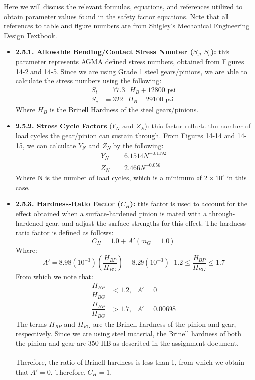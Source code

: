 \documentclass[letterpaper,12pt]{article}
\begin{document}
\noindent Here we will discuss the relevant formulas, equations, and references utilized to obtain parameter values found in the safety factor equations. Note that all references to table and figure numbers are from Shigley's Mechanical Engineering Design Textbook.
\begin{itemize}[leftmargin=3mm]
    \item \textbf{2.5.1. Allowable Bending/Contact Stress Number ($S_t$, $S_c$):} this parameter represents AGMA defined stress numbers, obtained from Figures 14-2 and 14-5. Since we are using Grade 1 steel gears/pinions, we are able to calculate the stress numbers using the following:
    \begin{align*}
        S_t &= 77.3\text{ }H_B + 12800 \text{ psi} \\
        S_c &= 322\text{ }H_B + 29100 \text{ psi}
    \end{align*}
    Where $H_B$ is the Brinell Hardness of the steel gears/pinions.
    
    \item \textbf{2.5.2. Stress-Cycle Factors} ($Y_N$ and $Z_N$): this factor reflects the number of load cycles the gear/pinion can sustain through. From Figures 14-14 and 14-15, we can calculate $Y_N$ and $Z_N$ by the following:
    \begin{align*}
        Y_N &= 6.1514 N^{-0.1192} \\
        Z_N &= 2.466 N^{-0.056}
    \end{align*}
    Where N is the number of load cycles, which is a minimum of $2 \times 10^4$ in this case.
    
    \item \textbf{2.5.3. Hardness-Ratio Factor ($C_H$):} this factor is used to account for the effect obtained when a surface-hardened pinion is mated with a through-hardened gear, and adjust the surface strengths for this effect. The hardness-ratio factor is defined as follows:
    \begin{equation}
        C_H = 1.0 + A'(m_G = 1.0)
    \end{equation}
    Where:
    \begin{equation*}
        A' = 8.98(10^{-3})\left(\dfrac{H_{BP}}{H_{BG}}\right) - 8.29(10^{-3})\text{ }1.2 \leq \frac{H_{BP}}{H_{BG}} \leq 1.7
    \end{equation*}
    From which we note that:
    \begin{align*}
        \dfrac{H_{BP}}{H_{BG}} &< 1.2, \text{ $A' = 0$} \\
        \dfrac{H_{BP}}{H_{BG}} &> 1.7, \text{ $A' = 0.00698$}
    \end{align*}
    The terms $H_{BP}$ and $H_{BG}$ are the Brinell hardness of the pinion and gear, respectively. Since we are using steel material, the Brinell hardness of both the pinion and gear are 350 HB as described in the assignment document. \\\\
    Therefore, the ratio of Brinell hardness is less than 1, from which we obtain that $A' = 0$. Therefore, $C_H = 1$.
    

\end{itemize}
\end{document}
